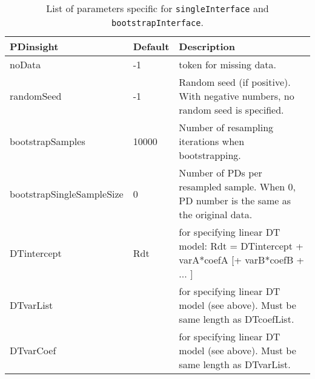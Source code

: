\documentclass[a4paper,12pt]{article}
\begin{document}
\begin{table}
	\caption{List of parameters specific for \texttt{singleInterface} and \texttt{bootstrapInterface}.}
\label{tab:parsBootstrap}
\begin{tabular}{l l p{}}
PDinsight& Default & Description\\
\hline
	noData &-1& token for missing data.\\
	randomSeed &-1 & Random seed (if positive). With negative numbers, no random seed is specified.\\
	bootstrapSamples & 10000 & Number of resampling iterations when bootstrapping.\\
	bootstrapSingleSampleSize & 0 & Number of PDs per resampled sample. When 0, PD number is the same as the original data.\\
	DTintercept &Rdt& for specifying linear DT model: Rdt = DTintercept + varA*coefA [+ varB*coefB + ... ] \\
	DTvarList && for specifying linear DT model (see above). Must be same length as DTcoefList.\\
	DTvarCoef && for specifying linear DT model (see above). Must be same length as DTvarList.\\


\end{tabular}
\end{table}
\end{document}
